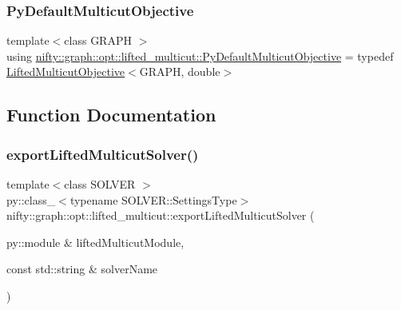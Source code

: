\mbox{\label{namespacenifty_1_1graph_1_1opt_1_1lifted__multicut_a50eb6f4cbd7b34af026c6031669b85cb}} 
\subsubsection{\texorpdfstring{Py\+Default\+Multicut\+Objective}{PyDefaultMulticutObjective}}
{\footnotesize\ttfamily template$<$class G\+R\+A\+PH $>$ \\
using \hyperlink{namespacenifty_1_1graph_1_1opt_1_1lifted__multicut_a50eb6f4cbd7b34af026c6031669b85cb}{nifty\+::graph\+::opt\+::lifted\+\_\+multicut\+::\+Py\+Default\+Multicut\+Objective} = typedef \hyperlink{classnifty_1_1graph_1_1opt_1_1lifted__multicut_1_1LiftedMulticutObjective}{Lifted\+Multicut\+Objective}$<$G\+R\+A\+PH, double$>$}



\subsection{Function Documentation}
\mbox{\label{namespacenifty_1_1graph_1_1opt_1_1lifted__multicut_a6f456f29118031b4510e2b92fc4af8df}} 
\subsubsection{\texorpdfstring{export\+Lifted\+Multicut\+Solver()}{exportLiftedMulticutSolver()}}
{\footnotesize\ttfamily template$<$class S\+O\+L\+V\+ER $>$ \\
py\+::class\+\_\+$<$typename S\+O\+L\+V\+E\+R\+::\+Settings\+Type$>$ nifty\+::graph\+::opt\+::lifted\+\_\+multicut\+::export\+Lifted\+Multicut\+Solver (\begin{DoxyParamCaption}\item[{py\+::module \&}]{lifted\+Multicut\+Module,  }\item[{const std\+::string \&}]{solver\+Name }\end{DoxyParamCaption})}

